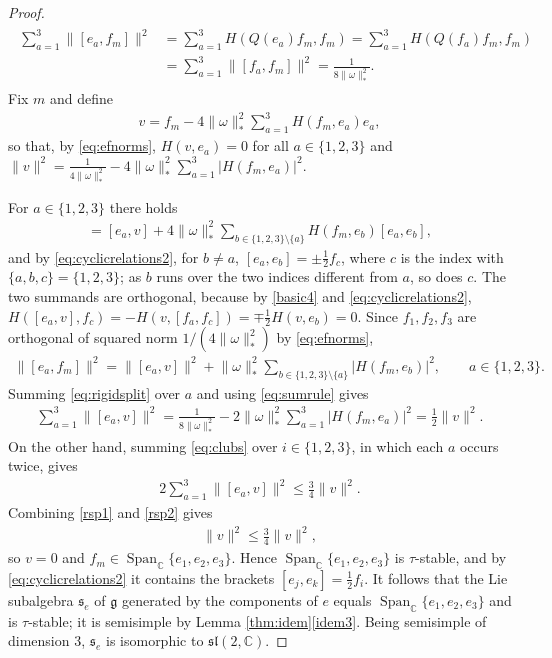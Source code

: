 \documentclass [leqno, 10pt]{amsart}
\theoremstyle{definition}
\numberwithin{equation}{section}
\newcommand{\om}{\omega}
\newcommand{\spn}{\operatorname{Span}}
\newcommand{\sll}{\mathfrak{sl}}
\newcommand{\g}{\mathfrak{g}}
\newcommand{\com}{\mathbb C}
\newcommand{\norm}[1]{\lVert #1\rVert}
\newcommand{\comass}[1]{\lVert #1\rVert_{\ast}}%
\newcommand{\subs}{\mathfrak{s}}
\newcommand{\qad}{Q}
\begin{document}
\begin{proof}
\begin{align}
\begin{aligned}
\sum_{a=1}^3\norm{[e_a,f_m]}^2&=\sum_{a=1}^3H(\qad(e_{a})f_{m}, f_{m}) = \sum_{a=1}^3H(\qad(f_{a})f_{m}, f_{m})\\
&= \sum_{a=1}^3\norm{[f_a,f_m]}^2= \frac{1}{8\comass{\om}^{2}}.
\end{aligned}
\end{align}
Fix $m$ and define
\begin{align}
v = f_{m} - 4\comass{\om}^{2}\sum_{a = 1}^{3}H(f_{m}, e_{a})e_{a},
\end{align}
so that, by \eqref{eq:efnorms}, $H(v, e_{a}) = 0$ for all $a \in \{1, 2, 3\}$ and $\norm{v}^{2} = \frac{1}{4\comass{\om}^{2}} - 4\comass{\om}^{2}\sum_{a=1}^{3}|H(f_{m}, e_{a})|^{2}$.

For $a \in \{1, 2, 3\}$ there holds
\begin{align}
[e_{a}, f_{m}] = [e_{a}, v] + 4\comass{\om}^{2}\sum_{b \in \{1, 2, 3\}\setminus\{a\}}H(f_{m}, e_{b})[e_{a}, e_{b}],
\end{align}
and by \eqref{eq:cyclicrelations2}, for $b \neq a$, $[e_{a}, e_{b}] = \pm \tfrac{1}{2}f_{c}$, where $c$ is the index with $\{a, b, c\} = \{1, 2, 3\}$; as $b$ runs over the two indices different from $a$, so does $c$. The two summands are orthogonal, because by \eqref{basic4} and \eqref{eq:cyclicrelations2}, $H([e_{a}, v], f_{c}) = -H(v, [f_{a}, f_{c}]) = \mp \tfrac{1}{2}H(v, e_{b}) = 0$. Since $f_{1}, f_{2}, f_{3}$ are orthogonal of squared norm $1/(4\comass{\om}^{2})$ by \eqref{eq:efnorms},
\begin{align}\label{eq:rigidsplit}
\norm{[e_{a}, f_{m}]}^{2} = \norm{[e_{a}, v]}^{2} + \comass{\om}^{2}\sum_{b \in \{1, 2, 3\}\setminus\{a\}}|H(f_{m}, e_{b})|^{2}, \qquad a \in \{1, 2, 3\}.
\end{align}
Summing \eqref{eq:rigidsplit} over $a$ and using \eqref{eq:sumrule} gives
\begin{align}\label{rsp1}
\sum_{a=1}^{3}\norm{[e_{a}, v]}^{2} = \frac{1}{8\comass{\om}^{2}} - 2\comass{\om}^{2}\sum_{a = 1}^{3}|H(f_{m}, e_{a})|^2 = \tfrac{1}{2}\norm{v}^{2}.
\end{align}
On the other hand, summing \eqref{eq:clubs} over $i \in \{1, 2, 3\}$, in which each $a$ occurs twice, gives
\begin{align}\label{rsp2}
2\sum_{a=1}^{3}\norm{[e_{a}, v]}^{2} \leq \tfrac{3}{4}\norm{v}^{2}.
\end{align}
Combining \eqref{rsp1} and \eqref{rsp2} gives
\begin{align}
\norm{v}^{2} \leq \tfrac{3}{4}\norm{v}^{2},
\end{align}
so $v = 0$ and $f_{m} \in \spn_{\com}\{e_{1}, e_{2}, e_{3}\}$. Hence $\spn_{\com}\{e_{1}, e_{2}, e_{3}\}$ is $\tau$-stable, and by \eqref{eq:cyclicrelations2} it contains the brackets $[e_{j}, e_{k}] = \tfrac{1}{2}f_{i}$. It follows that the Lie subalgebra $\subs_{e}$ of $\g$ generated by the components of $e$ equals $\spn_{\com}\{e_{1}, e_{2}, e_{3}\}$ and is $\tau$-stable; it is semisimple by Lemma \ref{thm:idem}\ref{idem3}. Being semisimple of dimension $3$, $\subs_{e}$ is isomorphic to $\sll(2, \com)$.
\end{proof}
\end{document}
